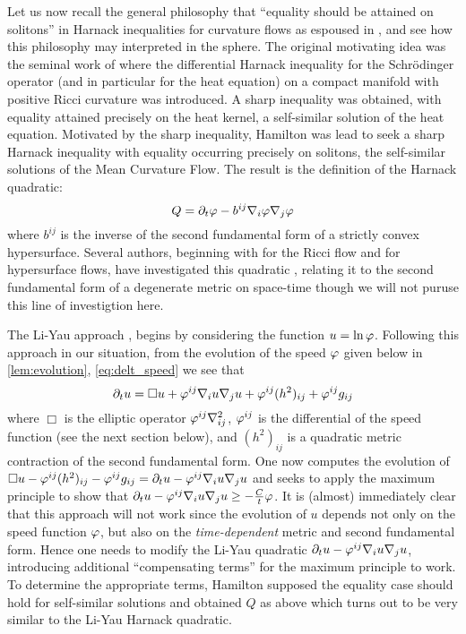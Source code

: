 \documentclass{amsart}
\begin{document}
Let us now recall the general philosophy that ``equality should be attained on solitons'' in Harnack inequalities for curvature flows as espoused in \cite{MR1316556}, and see how this philosophy may interpreted in the sphere. The original motivating idea was the seminal work of \cite{MR834612} where the differential Harnack inequality for the Schr\"odinger operator (and in particular for the heat equation) on a compact manifold with positive Ricci curvature was introduced. A sharp inequality was obtained, with equality attained precisely on the heat kernel, a self-similar solution of the heat equation. Motivated by the sharp inequality, Hamilton \cite{MR1316556} was lead to seek a sharp Harnack inequality with equality occurring precisely on solitons, the self-similar solutions of the Mean Curvature Flow. The result is the definition of the Harnack quadratic:
\begin{equation}
\label{eq:harnack_quadratic}
Q = \partial_t \varphi - b^{ij} \nabla_i \varphi \nabla_j \varphi
\end{equation}
where \(b^{ij}\) is the inverse of the second fundamental form of a strictly convex hypersurface. Several authors, beginning with \cite{MR1362964} for the Ricci flow and \cite{MR1856176} for hypersurface flows, have investigated this quadratic \cite{kotschwarharnack,2013arXiv1301.1543H}, relating it to the second fundamental form of a degenerate metric on space-time though we will not puruse this line of investigtion here.

The Li-Yau approach \cite{MR834612}, begins by considering the function \(u = \ln \varphi\). Following this approach in our situation, from the evolution of the speed \(\varphi\) given below in \cref{lem:evolution}, \cref{eq:delt_speed} we see that
\[
\partial_t u = \Box u + \varphi^{ij} \nabla_i u \nabla_j u + \varphi^{ij}(h^2)_{ij} + \varphi^{ij}g_{ij}
\]
where \(\Box\) is the elliptic operator \(\varphi^{ij} \nabla^2_{ij}\), \(\varphi^{ij}\) is the differential of the speed function (see the next section below), and \((h^2)_{ij}\) is a quadratic metric contraction of the second fundamental form. One now computes the evolution of \(\Box u - \varphi^{ij}(h^2)_{ij} - \varphi^{ij}g_{ij} = \partial_t u - \varphi^{ij} \nabla_i u \nabla_j u\) and seeks to apply the maximum principle to show that \(\partial_t u - \varphi^{ij} \nabla_i u \nabla_j u \geq - \tfrac{C}{t}\varphi\). It is (almost) immediately clear that this approach will not work since the evolution of \(u\) depends not only on the speed function \(\varphi\), but also on the \emph{time-dependent} metric and second fundamental form. Hence one needs to modify the Li-Yau quadratic \(\partial_t u - \varphi^{ij} \nabla_i u \nabla_j u\), introducing additional ``compensating terms'' for the maximum principle to work. To determine the appropriate terms, Hamilton supposed the equality case should hold for self-similar solutions and obtained \(Q\) as above which turns out to be very similar to the Li-Yau Harnack quadratic.
\end{document}
